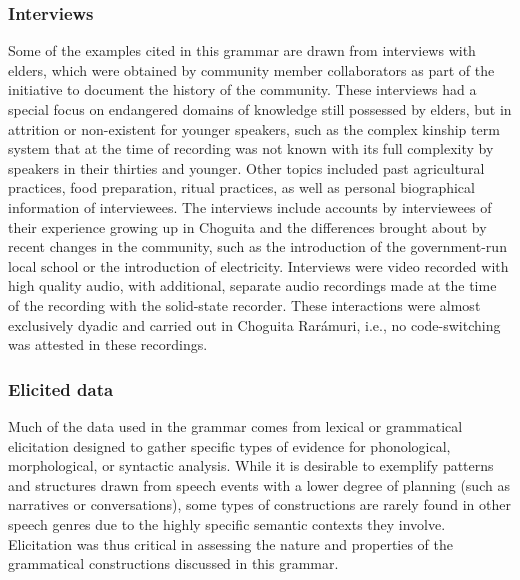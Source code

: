 \subsubsection{Interviews}
\label{subsubsec: interviews}

Some of the examples cited in this grammar are drawn from interviews with elders, which were obtained by community member collaborators as part of the initiative to document the history of the community. These interviews had a special focus on endangered domains of knowledge still possessed by elders, but in attrition or non-existent for younger speakers, such as the complex kinship term system that at the time of recording was not known with its full complexity by speakers in their thirties and younger. Other topics included past agricultural practices, food preparation, ritual practices, as well as personal biographical information of interviewees. The interviews include accounts by interviewees of their experience growing up in Choguita and the differences brought about by recent changes in the community, such as the introduction of the government-run local school or the introduction of electricity. Interviews were video recorded with high quality audio, with additional, separate audio recordings made at the time of the recording with the solid-state recorder. These interactions were almost exclusively dyadic and carried out in Choguita Rarámuri, i.e., no code-switching was attested in these recordings.

\subsubsection{Elicited data}
\label{subsubsec: elicited data}

Much of the data used in the grammar comes from lexical or grammatical elicitation designed to gather specific types of evidence for phonological, morphological, or syntactic analysis. While it is desirable to exemplify patterns and structures drawn from speech events with a lower degree of planning (such as narratives or conversations), some types of constructions are rarely found in other speech genres due to the highly specific semantic contexts they involve. Elicitation was thus critical in assessing the nature and properties of the grammatical constructions discussed in this grammar.

